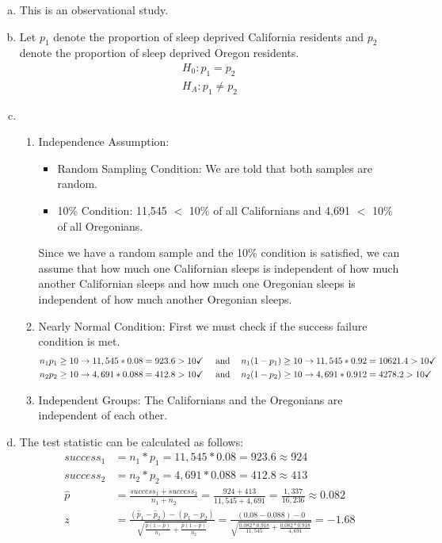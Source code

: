 {
\begin{enumerate}[(a)]

\item This is an observational study.

\item Let $p_1$ denote the proportion of sleep deprived California residents and $p_2$ denote the proportion of sleep deprived Oregon residents.
\begin{align*}
H_0: p_1 = p_2 \\
H_A: p_1 \ne p_2
\end{align*}

\item 
\begin{enumerate}[1.]
\item Independence Assumption: 
\begin{itemize}
\item Random Sampling Condition: We are told that both samples are random.
\item 10\% Condition: 11,545 $<$ 10\% of all Californians and 4,691 $<$ 10\% of all Oregonians.
\end{itemize}
Since we have a random sample and the 10\% condition is satisfied, we can assume that how much one Californian sleeps is independent of how much another Californian sleeps and how much one Oregonian sleeps is independent of how much another Oregonian sleeps.
\item Nearly Normal Condition: First we must check if the success failure condition is met.
\begin{align*}
n_1p_1 &\ge 10 \rightarrow 11,545 * 0.08 = 923.6 > 10 \checkmark &\text{  and \hspace{2mm} } n_1(1 - p_1) &\ge 10 \rightarrow 11,545 * 0.92 = 10621.4 > 10 \checkmark \\
n_2p_2 &\ge 10 \rightarrow 4,691 * 0.088 = 412.8 > 10 \checkmark &\text{  and \hspace{2mm} } n_2(1 - p_2) &\ge 10 \rightarrow 4,691 * 0.912 = 4278.2 > 10 \checkmark \\
\end{align*}
\item Independent Groups: The Californians and the Oregonians are independent of each other.
\end{enumerate}

\item The test statistic can be calculated as follows:
\begin{align*}
success_1 &= n_1 * p_1 = 11,545 * 0.08 = 923.6 \approx 924 \\
success_2 &= n_2 * p_2 = 4,691 * 0.088 = 412.8 \approx 413 \\
\hat{p}&= \frac{success_1 + success_2}{n_1 + n_2} = \frac{924 + 413}{11,545 + 4,691} = \frac{1,337}{16,236} \approx 0.082 \\
z &= \frac{(\hat{p}_1 - \hat{p}_2) - (p_1 - p_2)}{\sqrt{\frac{\hat{p} (1 - \hat{p}) }{n_1} + \frac{\hat{p} (1 - \hat{p})}{n_2}}} = \frac{(0.08 - 0.088) - 0}{\sqrt{\frac{0.082 * 0.918}{11,545} + \frac{0.082 * 0.918}{4,691}}} = -1.68
\end{align*}


\end{enumerate}}
